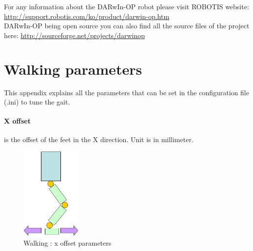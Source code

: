 \documentclass[a4paper, 12pt]{article}  		%
\begin{document}
For any information about the DARwIn-OP robot please visit ROBOTIS website: \url{http://support.robotis.com/ko/product/darwin-op.htm}\\

DARwIn-OP being open source you can also find all the source files of the project here: \url{http://sourceforge.net/projects/darwinop}\\


\appendix
\newpage
{} %


\section{Walking parameters} \label{sec:walkParameter}

This appendix explains all the parameters that can be set in the configuration file (.ini) to tune the gait.\\ 

\paragraph*{X offset}
is the offset of the feet in the X direction. Unit is in millimeter.
\begin{figure}[H]
\begin{center}
\includegraphics[width=3cm]{x_offset.jpg}
\caption{Walking : x offset parameters}
\label{x_offset}
\end{center}
\end{figure}
\end{document}
